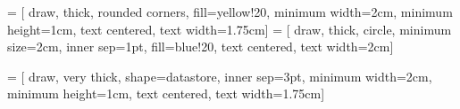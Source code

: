 \makeatletter
{}
\makeatother
{} = [
    draw,
    thick,
    rounded corners,
    fill=yellow!20,
    minimum width=2cm, 
    minimum height=1cm,
    text centered, 
    text width=1.75cm]
 = [
    draw,
    thick,
    circle,
    minimum size=2cm,
    inner sep=1pt,
    fill=blue!20,
    text centered, 
    text width=2cm]

 = [
    draw,
    very thick,
    shape=datastore,
    inner sep=3pt,
    minimum width=2cm, 
    minimum height=1cm,
    text centered, 
    text width=1.75cm]

